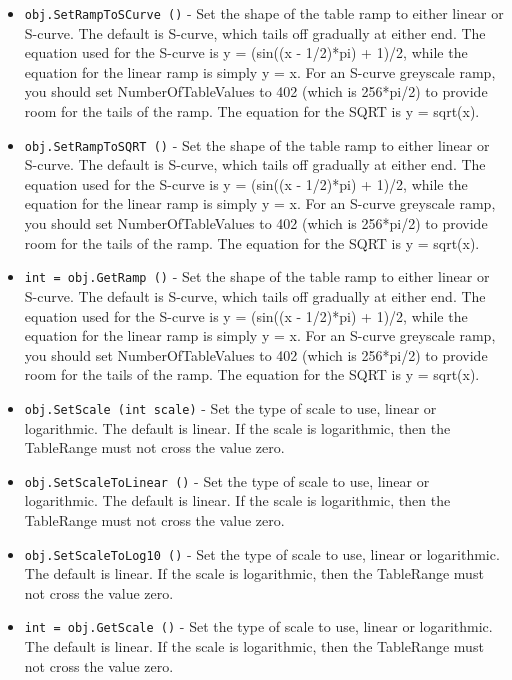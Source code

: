 \begin{itemize}
\item  \verb|obj.SetRampToSCurve ()| -  Set the shape of the table ramp to either linear or S-curve.
 The default is S-curve, which tails off gradually at either end.  
 The equation used for the S-curve is y = (sin((x - 1/2)*pi) + 1)/2,
 while the equation for the linear ramp is simply y = x.  For an
 S-curve greyscale ramp, you should set NumberOfTableValues to 402 
 (which is 256*pi/2) to provide room for the tails of the ramp.
 The equation for the SQRT is y = sqrt(x).  

\item  \verb|obj.SetRampToSQRT ()| -  Set the shape of the table ramp to either linear or S-curve.
 The default is S-curve, which tails off gradually at either end.  
 The equation used for the S-curve is y = (sin((x - 1/2)*pi) + 1)/2,
 while the equation for the linear ramp is simply y = x.  For an
 S-curve greyscale ramp, you should set NumberOfTableValues to 402 
 (which is 256*pi/2) to provide room for the tails of the ramp.
 The equation for the SQRT is y = sqrt(x).  

\item  \verb|int = obj.GetRamp ()| -  Set the shape of the table ramp to either linear or S-curve.
 The default is S-curve, which tails off gradually at either end.  
 The equation used for the S-curve is y = (sin((x - 1/2)*pi) + 1)/2,
 while the equation for the linear ramp is simply y = x.  For an
 S-curve greyscale ramp, you should set NumberOfTableValues to 402 
 (which is 256*pi/2) to provide room for the tails of the ramp.
 The equation for the SQRT is y = sqrt(x).  

\item  \verb|obj.SetScale (int scale)| -  Set the type of scale to use, linear or logarithmic.  The default
 is linear.  If the scale is logarithmic, then the TableRange must not
 cross the value zero.

\item  \verb|obj.SetScaleToLinear ()| -  Set the type of scale to use, linear or logarithmic.  The default
 is linear.  If the scale is logarithmic, then the TableRange must not
 cross the value zero.

\item  \verb|obj.SetScaleToLog10 ()| -  Set the type of scale to use, linear or logarithmic.  The default
 is linear.  If the scale is logarithmic, then the TableRange must not
 cross the value zero.

\item  \verb|int = obj.GetScale ()| -  Set the type of scale to use, linear or logarithmic.  The default
 is linear.  If the scale is logarithmic, then the TableRange must not
 cross the value zero.


\end{itemize}
